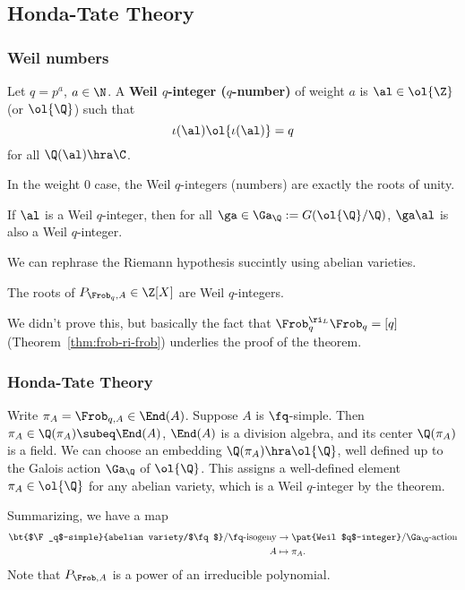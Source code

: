 \subsection{Honda-Tate Theory}
\subsubsection{Weil numbers}
\begin{df}
Let $q=p^a$, $a\in \N$. A \textbf{Weil $q$-integer ($q$-number)} of weight $a$ is $\al\in \ol{\Z}$ (or $\ol{\Q}$)
such that
\[
\iota(\al)\ol{\iota(\al)}=q
\]
for all $\Q(\al)\hra \C$.
\end{df}
In the weight 0 case, the Weil $q$-integers (numbers) are exactly the roots of unity.

\begin{rem}
If $\al$ is a Weil $q$-integer, then for all $\ga\in \Ga_{\Q}:=G(\ol{\Q}/\Q)$,  $\ga\al$ is also a Weil $q$-integer. 
\end{rem}

We can rephrase the Riemann hypothesis succintly using abelian varieties.
\begin{thm}
The roots of $P_{\Frob_q,A}\in \Z[X]$ are Weil $q$-integers.
\end{thm}
We didn't prove this, but basically the fact that %
$\Frob_q^{\ri_L}\Frob_q=[q]$ (Theorem~\ref{thm:frob-ri-frob}) underlies the proof of the theorem. 

\subsubsection{Honda-Tate Theory}

Write $\pi_A=\Frob_{q,A}\in \End(A)$. Suppose $A$ is $\fq$-simple. Then $\pi_A\in \Q(\pi_A)\subeq \End(A)$, $\End(A)$ is a division algebra, and its center $\Q(\pi_A)$ is a field. We can choose an embedding $\Q(\pi_A)\hra \ol{\Q}$, well defined up to the Galois action $\Ga_{\Q}$ of $\ol{\Q}$. This assigns a well-defined element $\pi_A\in \ol{\Q}$ for any abelian variety, which is a Weil $q$-integer by the theorem.

Summarizing, we have a map
\begin{align*}
\bt{$\F_q$-simple}{abelian variety/$\fq$}/\fq\text{-isogeny} &\to \pat{Weil $q$-integer}/\Ga_{\Q}\text{-action}\\
A&\mapsto \pi_A.
\end{align*}
Note that $P_{\Frob,A}$ is a power of an irreducible polynomial.

